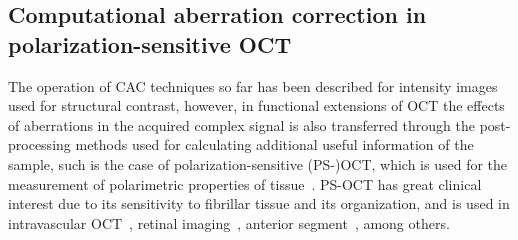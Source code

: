 


\FloatBarrier

\subsection{Computational aberration correction in polarization-sensitive OCT}

The operation of CAC techniques so far has been described for intensity images used for structural contrast, however, in functional extensions of OCT the effects of aberrations in the acquired complex signal is also transferred through the post-processing methods used for calculating additional useful information of the sample, such is the case of polarization-sensitive (PS-)OCT, which is used for the measurement of polarimetric properties of tissue~\cite{deBoer1997_Twodimensional, deBoer2017_Polarization}. PS-OCT has great clinical interest due to its sensitivity to fibrillar tissue and its organization, and is used in intravascular OCT~\cite{Villiger2018_Coronary}, retinal imaging~\cite{Elmaanaoui2011_Birefringence, Cense2009_Retinal}, anterior segment~\cite{Li2020_Vectorial}, among others.

